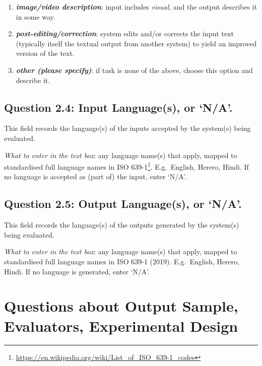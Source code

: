 \documentclass[11pt,a4paper]{article}
\makeatletter
\newcommand{\egcvalue}[1]{\textbf{\textit{#1}}}
\newcommand\footnoteref[1]{\protected@xdef\@thefnmark{\ref{#1}}\@footnotemark}
\makeatother
\begin{document}
\begin{enumerate}[itemsep=0cm,leftmargin=0.5cm,label={\small $\square$}]
    \item \egcvalue{image/video description}: input includes \textit{visual}, and the output describes it in some way.
    
    \item \egcvalue{post-editing/correction}: system edits and/or corrects the input text (typically itself the textual output from another system) to yield an improved version of the text.
       
    \item \egcvalue{other (please specify)}: if task is none of the above, choose this option and describe it.
    \end{enumerate}


\vspace{-.3cm}
\subsection*{Question 2.4: Input Language(s), or `N/A'.}
\vspace{-.1cm}

This field records the language(s) of the inputs accepted by the system(s) being evaluated.
        
\vspace{.3cm}
\noindent\textit{What to enter in the text box}: any  language name(s) that apply, mapped to standardised full language names in ISO 639-1\footnote{\label{iso}\url{https://en.wikipedia.org/wiki/List_of_ISO_639-1_codes}}. E.g.\ English, Herero, Hindi. 
If no language is accepted as (part of) the input, enter `N/A'.
        
\vspace{-.3cm}
\subsection*{Question 2.5: Output Language(s), or `N/A'.}
\vspace{-.1cm}

This field records the language(s) of the outputs generated by the system(s) being evaluated.
        
\vspace{.2cm}
\noindent\textit{What to enter in the text box}: any  language name(s) that apply, mapped to standardised full language names in ISO 639-1 (2019)\footnoteref{iso}. E.g.\ English, Herero, Hindi. 
If no language is generated, enter `N/A'.


\section{Questions about Output Sample, Evaluators, Experimental Design}\label{sec:design}
\end{document}
